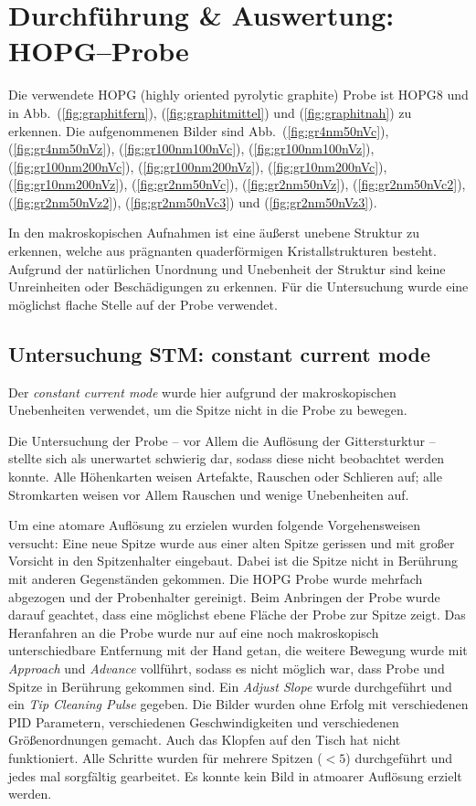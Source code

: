 \documentclass[sn-mathphys-num,iicol]{sn-jnl}
\theoremstyle{thmstyleone}
\theoremstyle{thmstyletwo}
\theoremstyle{thmstylethree}
\begin{document}
\section{Durchführung \& Auswertung:\\HOPG--Probe}
Die verwendete HOPG (highly oriented pyrolytic graphite) Probe ist \glqq HOPG8\grqq{} und in Abb.\ (\ref{fig:graphitfern}), (\ref{fig:graphitmittel}) und (\ref{fig:graphitnah}) zu erkennen.
Die aufgenommenen Bilder sind Abb.\ (\ref{fig:gr4nm50nVc}), (\ref{fig:gr4nm50nVz}), (\ref{fig:gr100nm100nVc}), (\ref{fig:gr100nm100nVz}), (\ref{fig:gr100nm200nVc}), (\ref{fig:gr100nm200nVz}), (\ref{fig:gr10nm200nVc}), (\ref{fig:gr10nm200nVz}), (\ref{fig:gr2nm50nVc}), (\ref{fig:gr2nm50nVz}), (\ref{fig:gr2nm50nVc2}), (\ref{fig:gr2nm50nVz2}), (\ref{fig:gr2nm50nVc3}) und (\ref{fig:gr2nm50nVz3}).

In den makroskopischen Aufnahmen ist eine äußerst unebene Struktur zu erkennen, welche aus prägnanten quaderförmigen Kristallstrukturen besteht. %
Aufgrund der natürlichen Unordnung und Unebenheit der Struktur sind keine Unreinheiten oder Beschädigungen zu erkennen.
Für die Untersuchung wurde eine möglichst flache Stelle auf der Probe verwendet.

\subsection{Untersuchung STM: constant current mode}
Der \textit{constant current mode} wurde hier aufgrund der makroskopischen Unebenheiten verwendet, um die Spitze nicht in die Probe zu bewegen.

Die Untersuchung der Probe -- vor Allem die Auflösung der Gittersturktur -- stellte sich als unerwartet schwierig dar, sodass diese nicht beobachtet werden konnte.
Alle Höhenkarten weisen Artefakte, Rauschen oder Schlieren auf; alle Stromkarten weisen vor Allem Rauschen und wenige Unebenheiten auf.

Um eine atomare Auflösung zu erzielen wurden folgende Vorgehensweisen versucht:
Eine neue Spitze wurde aus einer alten Spitze gerissen und mit großer Vorsicht in den Spitzenhalter eingebaut.
Dabei ist die Spitze nicht in Berührung mit anderen Gegenständen gekommen.
Die HOPG Probe wurde mehrfach abgezogen und der Probenhalter gereinigt.
Beim Anbringen der Probe wurde darauf geachtet, dass eine möglichst ebene Fläche der Probe zur Spitze zeigt.
Das Heranfahren an die Probe wurde nur auf eine noch makroskopisch unterschiedbare Entfernung mit der Hand getan, die weitere Bewegung wurde mit \textit{Approach} und \textit{Advance} vollführt, sodass es nicht möglich war, dass Probe und Spitze in Berührung gekommen sind.
Ein \textit{Adjust Slope} wurde durchgeführt und ein \textit{Tip Cleaning Pulse} gegeben.
Die Bilder wurden ohne Erfolg mit verschiedenen PID Parametern, verschiedenen Geschwindigkeiten und verschiedenen Größenordnungen gemacht.
Auch das Klopfen auf den Tisch hat nicht funktioniert.
Alle Schritte wurden für mehrere Spitzen ($<5$) durchgeführt und jedes mal sorgfältig gearbeitet.
Es konnte kein Bild in atmoarer Auflösung erzielt werden.
\end{document}
